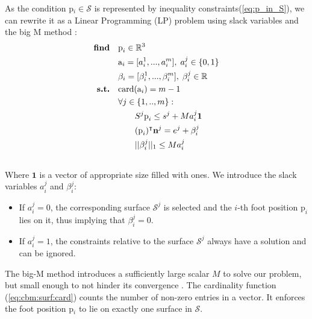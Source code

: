 As the condition p$_i \in \mathcal{S}$ is represented by inequality constraints(\ref{eq:p_in_S}), we can rewrite it as a Linear Programming (LP) problem using slack variables and the big M method \cite{big_M}:
\begin{align}
    \textrm{\textbf{find}}  \quad & \mbox{p}_i \in \mathbb{R}^3 \nonumber\\
                            \quad & \mbox{a}_i=[a_i^1,...,a_i^m], \; a_i^j \in \{0,1\} \nonumber\\
                            \quad & \beta_i=[\beta_i^1,...,\beta_i^m], \; \beta_i^j \in \mathbb{R} \nonumber\\
    \textrm{\textbf{s.t.}}  \quad & \mbox{card}(\mbox{a}_i) = m-1 \label{eq:cbm:surf:card}\\
                            \quad & \forall j \in \{1,..,m\} : \nonumber\\
                            \quad & \quad \quad S^j\mbox{p}_i \leq s^j + M a_i^j \textbf{1} \nonumber\\
                            \quad & \quad \quad (\mbox{p}_i)^{\intercal} \textbf{n}^j = e^j + \beta_i^j \nonumber\\
                            \quad & \quad \quad ||\beta_i^j||_1 \leq M a_i^j \nonumber\\
                            \nonumber
\end{align}
Where $\textbf{1}$ is a vector of appropriate size filled with ones.
We introduce the slack variables $a_i^j$ and $\beta_i^j$:
\begin{itemize}
    \item If $a_i^j = 0$, the corresponding surface $\mathcal{S}^j$ is selected and the $i$-th foot position $\mbox{p}_i$ lies on it, thus implying that $\beta_i^j = 0$.
    \item If $a_i^j = 1$, the constraints relative to the surface $\mathcal{S}^j$ always have a solution and can be ignored.
\end{itemize}
The big-M method introduces a sufficiently large scalar $M$ to solve our problem, but small enough to not hinder its convergence \cite{big_M_danger}.
The cardinality function (\ref{eq:cbm:surf:card}) counts the number of non-zero entries in a vector. 
It enforces the foot position p$_i$ to lie on exactly one surface in $\mathcal{S}$.

